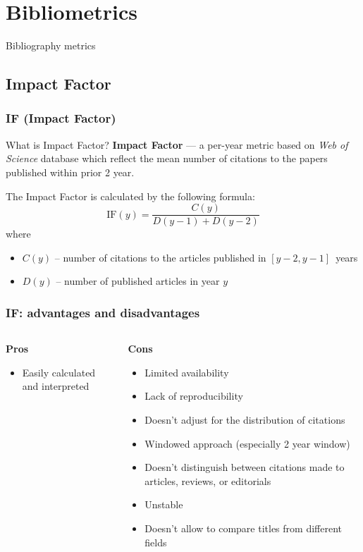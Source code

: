 \documentclass{beamer}
\newcommand{\pros}{\item[{\textcolor[HTML]{3C8031}{\ding{51}}}]}
\newcommand{\cons}{\item[\textcolor{red}{\ding{54}}]}
\newcommand{\wos}{\textit{Web of Science} }
\begin{document}
\section{Bibliometrics}

\begin{frame}
    \centering
    \Huge
    Bibliography metrics
\end{frame}

\subsection{Impact Factor}
\begin{frame}
    \frametitle{IF (Impact Factor)}
    \begin{block}{What is Impact Factor?}
        \textbf{Impact Factor}\cite{garfield1972citation} --- a per-year
        metric based on \wos database which reflect the mean number of citations
        to the papers published within prior 2 year.
    \end{block}

    The Impact Factor is calculated by the following formula:
    \[
        \text{IF}(y) = \frac{C(y)}{D(y - 1) + D(y - 2)}
    \]
    where
    \begin{itemize}
        \item $C(y)$ -- number of citations to the articles published in $[y-2, y-1]$~years
        \item $D(y)$ -- number of published articles in year $y$
    \end{itemize}
\end{frame}

\begin{frame}
    \frametitle{IF: advantages and disadvantages}
    \begin{columns}[T]
        \begin{column}{.5\textwidth}
            \centering \textbf{Pros}
            \begin{itemize}[<+->]
                \pros Easily calculated and interpreted
            \end{itemize}
        \end{column}
        \begin{column}{.5\textwidth}
            \centering \textbf{Cons}
            \begin{itemize}[<+->]
                \cons Limited availability
                \cons Lack of reproducibility
                \cons Doesn’t adjust for the distribution of citations
                \cons Windowed approach (especially 2 year window)
                \cons Doesn’t distinguish between citations made to articles, reviews, or editorials
                \cons Unstable
                \cons Doesn't allow to compare titles from different fields
            \end{itemize}
        \end{column}
    \end{columns}
\end{frame}
\end{document}
